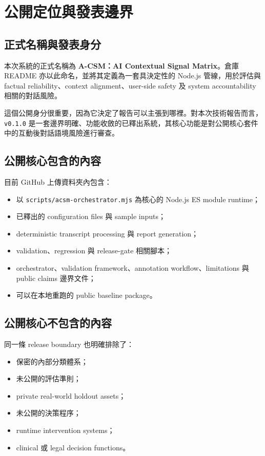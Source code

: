 \documentclass[11pt,a4paper]{article}
\begin{document}
\section{公開定位與發表邊界}

\subsection{正式名稱與發表身分}

本次系統的正式名稱為 \textbf{A-CSM：AI Contextual Signal Matrix}。倉庫 README 亦以此命名，並將其定義為一套具決定性的 Node.js 管線，用於評估與 factual reliability、context alignment、user-side safety 及 system accountability 相關的對話風險。

這個公開身分很重要，因為它決定了報告可以主張到哪裡。對本次技術報告而言，\texttt{v0.1.0} 是一套邊界明確、功能收斂的已釋出系統，其核心功能是對公開核心套件中的互動後對話語境風險進行審查。

\subsection{公開核心包含的內容}

目前 GitHub 上傳資料夾內包含：

\begin{itemize}[leftmargin=1.8em]
\item 以 \texttt{scripts/acsm-orchestrator.mjs} 為核心的 Node.js ES module runtime；
\item 已釋出的 configuration files 與 sample inputs；
\item deterministic transcript processing 與 report generation；
\item validation、regression 與 release-gate 相關腳本；
\item orchestrator、validation framework、annotation workflow、limitations 與 public claims 邊界文件；
\item 可以在本地重跑的 public baseline package。
\end{itemize}

\subsection{公開核心不包含的內容}

同一條 release boundary 也明確排除了：

\begin{itemize}[leftmargin=1.8em]
\item 保密的內部分類體系；
\item 未公開的評估準則；
\item private real-world holdout assets；
\item 未公開的決策程序；
\item runtime intervention systems；
\item clinical 或 legal decision functions。
\end{itemize}
\end{document}
